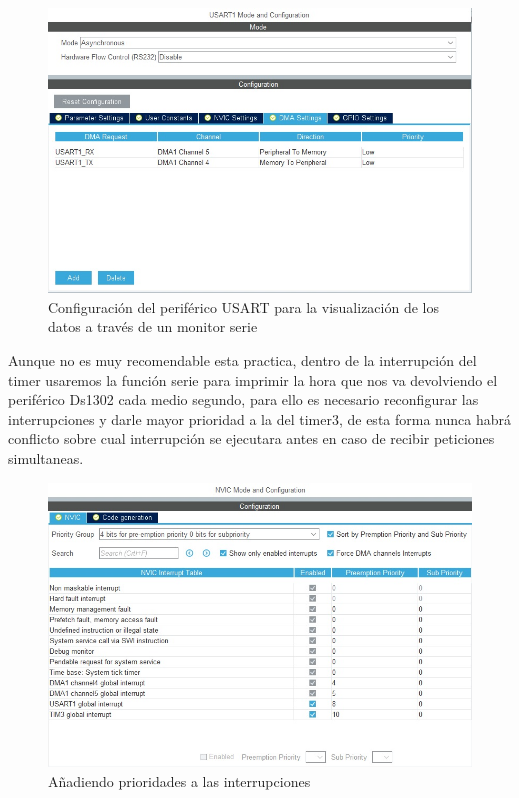 \documentclass[10pt,a4paper,oneside]{article}
\begin{document}
\begin{figure}[H]
\centering
\includegraphics[scale=0.5]{Imagenes/Usart_cfg3.jpg}
\caption[Configuración del periférico USART para la visualización de los datos a través de un monitor serie]{Configuración del periférico USART para la visualización de los datos a través de un monitor serie}
\label{fig:009}
\end{figure}

Aunque no es muy recomendable esta practica, dentro de la interrupción del timer usaremos la función serie para imprimir la hora que nos va devolviendo el periférico Ds1302 cada medio segundo, para ello es necesario reconfigurar las interrupciones y darle mayor prioridad a la del timer3, de esta forma nunca habrá conflicto sobre cual interrupción se ejecutara antes en caso de recibir peticiones simultaneas.

\begin{figure}[H]
\centering
\includegraphics[scale=0.5]{Imagenes/Nvic_cfg1.jpg}
\caption[Añadiendo prioridades a las interrupciones]{Añadiendo prioridades a las interrupciones}
\label{fig:010}
\end{figure}
\end{document}
